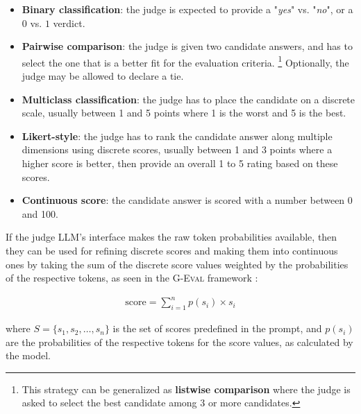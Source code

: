 \documentclass[noindent,nohyp,parspace,titlepage,twoside,12pt]{article}
\begin{document}
        \begin{itemize}
          \item \textbf{Binary classification}: the judge is expected to
                provide a "\emph{yes}" vs. "\emph{no}", or a $0$ vs. $1$
                verdict.

          \item \textbf{Pairwise comparison}: the judge is given two candidate
                answers, and has to select the one that is a better fit for the
                evaluation criteria. \footnote{This strategy can be generalized
                as \textbf{listwise comparison} where the judge is asked to
                select the best candidate among 3 or more candidates.}
                Optionally, the judge may be allowed to declare a tie.

          \item \textbf{Multiclass classification}: the judge has to place the
                candidate on a discrete scale, usually between 1 and 5 points
                where 1 is the worst and 5 is the best.

          \item \textbf{Likert-style}: the judge has to rank the candidate
                answer along multiple dimensions using discrete scores, usually
                between 1 and 3 points where a higher score is better, then
                provide an overall 1 to 5 rating based on these scores.

          \item \textbf{Continuous score}: the candidate answer is scored with
                a number between 0 and 100.
        \end{itemize}

        If the judge LLM's interface makes the raw token probabilities
        available, then they can be used for refining discrete scores and
        making them into continuous ones by taking the sum of the discrete
        score values weighted by the probabilities of the respective tokens, as
        seen in the \textsc{G-Eval} framework \cite{geval}:

        \begin{align}
          \text{score} = \sum_{i=1}^n p(s_i) \times s_i
        \end{align}

        where $S = \{s_1, s_2, \ldots, s_n\}$ is the set of scores predefined
        in the prompt, and $p(s_i)$ are the probabilities of the respective
        tokens for the score values, as calculated by the model.
\end{document}
